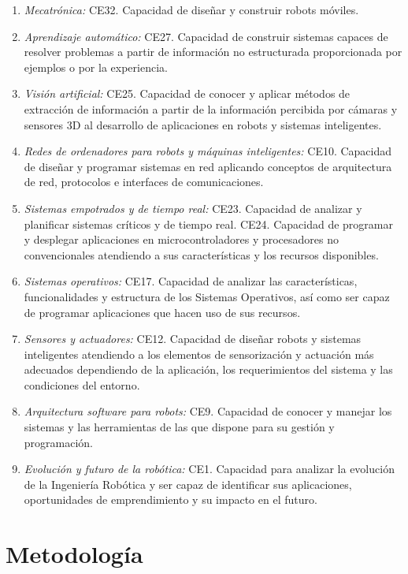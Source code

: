 \begin{enumerate}
	\item \textit{Mecatrónica:} CE32. Capacidad de diseñar y construir robots móviles.
	\item \textit{Aprendizaje automático:} CE27. Capacidad de construir sistemas capaces de resolver problemas a partir de información no estructurada proporcionada por ejemplos o por la experiencia.
	\item \textit{Visión artificial:} CE25. Capacidad de conocer y aplicar métodos de extracción de información a partir de la información percibida por cámaras y sensores 3D al desarrollo de aplicaciones en robots y sistemas inteligentes.
	\item \textit{Redes de ordenadores para robots y máquinas inteligentes:} CE10. Capacidad de diseñar y programar sistemas en red aplicando conceptos de arquitectura de red, protocolos e interfaces de comunicaciones.
	\item \textit{Sistemas empotrados y de tiempo real:} CE23. Capacidad de analizar y planificar sistemas críticos y de tiempo real. CE24. Capacidad de programar y desplegar aplicaciones en microcontroladores y procesadores no convencionales atendiendo a sus características y los recursos disponibles.
	\item \textit{Sistemas operativos:} CE17. Capacidad de analizar las características, funcionalidades y estructura de los Sistemas Operativos, así como ser capaz de programar aplicaciones que hacen uso de sus recursos.
	\item \textit{Sensores y actuadores:} CE12. Capacidad de diseñar robots y sistemas inteligentes atendiendo a los elementos de sensorización y actuación más adecuados dependiendo de la aplicación, los requerimientos del sistema y las condiciones del entorno.
	\item \textit{Arquitectura software para robots:} CE9. Capacidad de conocer y manejar los sistemas y las herramientas de las que dispone para su gestión y programación.
	\item \textit{Evolución y futuro de la robótica:} CE1. Capacidad para analizar la evolución de la Ingeniería Robótica y ser capaz de identificar sus aplicaciones, oportunidades de emprendimiento y su impacto en el futuro.
\end{enumerate}

 
\section{Metodología}
\label{sec:metodologia}


